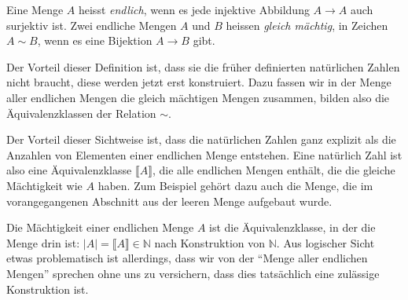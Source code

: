 \begin{definition}
Eine Menge $A$ heisst {\em endlich}, wenn es jede injektive Abbildung
$A\to A$ auch surjektiv ist.
%
Zwei endliche Mengen $A$ und $B$ heissen {\em gleich mächtig},
%
in Zeichen $A\sim B$, wenn es eine Bijektion
$A\to B$ gibt.
\end{definition}

Der Vorteil dieser Definition ist, dass sie die früher definierten 
natürlichen Zahlen nicht braucht, diese werden jetzt erst konstruiert.
Dazu fassen wir in der Menge aller endlichen Mengen die gleich mächtigen
Mengen zusammen, bilden also die Äquivalenzklassen der Relation $\sim$.
%

Der Vorteil dieser Sichtweise ist, dass die natürlichen Zahlen ganz
explizit als die Anzahlen von Elementen einer endlichen Menge entstehen.
Eine natürlich Zahl ist also eine Äquivalenzklasse
$\llbracket A\rrbracket$, die alle endlichen Mengen enthält,  die die
gleiche Mächtigkeit wie $A$ haben.
Zum Beispiel gehört dazu auch die Menge, die im vorangegangenen
Abschnitt aus der leeren Menge aufgebaut wurde.

Die Mächtigkeit einer endlichen Menge $A$ ist die Äquivalenzklasse, in der
die Menge drin ist: $|A| = \llbracket A\rrbracket\in \mathbb{N}$ nach 
Konstruktion von $\mathbb{N}$.
Aus logischer Sicht etwas problematisch ist allerdings, dass wir 
von der ``Menge aller endlichen Mengen'' sprechen ohne uns zu versichern,
dass dies tatsächlich eine zulässige Konstruktion ist.

